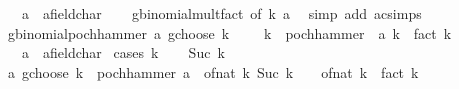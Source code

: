 \begin{isabellebody}
\ \ \ a\ {\isacharcolon}{\kern0pt}{\isacharcolon}{\kern0pt}\ {\isachardoublequoteopen}{\isacharprime}{\kern0pt}a{\isacharcolon}{\kern0pt}{\isacharcolon}{\kern0pt}field{\isacharunderscore}{\kern0pt}char{\isacharunderscore}{\kern0pt}{}{\isachardoublequoteclose}\isanewline
%
\isadelimproof
\ \ %
\endisadelimproof
%
\isatagproof
{}\isamarkupfalse%
\ gbinomial{\isacharunderscore}{\kern0pt}mult{\isacharunderscore}{\kern0pt}fact\ {\isacharbrackleft}{\kern0pt}of\ k\ a{\isacharbrackright}{\kern0pt}\ \isamarkupfalse%
\ {\isacharparenleft}{\kern0pt}simp\ add{\isacharcolon}{\kern0pt}\ ac{\isacharunderscore}{\kern0pt}simps{\isacharparenright}{\kern0pt}%
\endisatagproof
{\isafoldproof}%
%
\isadelimproof
\isanewline
%
\endisadelimproof
\isanewline
{}\isamarkupfalse%
\ gbinomial{\isacharunderscore}{\kern0pt}pochhammer{\isacharcolon}{\kern0pt}\ {\isachardoublequoteopen}a\ gchoose\ k\ {\isacharequal}{\kern0pt}\ {\isacharparenleft}{\kern0pt}{\isacharminus}{\kern0pt}\ {}{\isacharparenright}{\kern0pt}\ {\isacharcircum}{\kern0pt}\ k\ {\isacharasterisk}{\kern0pt}\ pochhammer\ {\isacharparenleft}{\kern0pt}{\isacharminus}{\kern0pt}\ a{\isacharparenright}{\kern0pt}\ k\ {\isacharslash}{\kern0pt}\ fact\ k{\isachardoublequoteclose}\isanewline
\ \ \ a\ {\isacharcolon}{\kern0pt}{\isacharcolon}{\kern0pt}\ {\isachardoublequoteopen}{\isacharprime}{\kern0pt}a{\isacharcolon}{\kern0pt}{\isacharcolon}{\kern0pt}field{\isacharunderscore}{\kern0pt}char{\isacharunderscore}{\kern0pt}{}{\isachardoublequoteclose}\isanewline
%
\isadelimproof
%
\endisadelimproof
%
\isatagproof
{}\isamarkupfalse%
\ {\isacharparenleft}{\kern0pt}cases\ k{\isacharparenright}{\kern0pt}\isanewline
\ \ \isamarkupfalse%
\ {\isacharparenleft}{\kern0pt}Suc\ k{\isacharprime}{\kern0pt}{\isacharparenright}{\kern0pt}\isanewline
\ \ \isamarkupfalse%
\ \isamarkupfalse%
\ {\isachardoublequoteopen}a\ gchoose\ k\ {\isacharequal}{\kern0pt}\ pochhammer\ {\isacharparenleft}{\kern0pt}a\ {\isacharminus}{\kern0pt}\ of{\isacharunderscore}{\kern0pt}nat\ k{\isacharprime}{\kern0pt}{\isacharparenright}{\kern0pt}\ {\isacharparenleft}{\kern0pt}Suc\ k{\isacharprime}{\kern0pt}{\isacharparenright}{\kern0pt}\ {\isacharslash}{\kern0pt}\ {\isacharparenleft}{\kern0pt}{\isacharparenleft}{\kern0pt}{}\ {\isacharplus}{\kern0pt}\ of{\isacharunderscore}{\kern0pt}nat\ k{\isacharprime}{\kern0pt}{\isacharparenright}{\kern0pt}\ {\isacharasterisk}{\kern0pt}\ fact\ k{\isacharprime}{\kern0pt}{\isacharparenright}{\kern0pt}{\isachardoublequoteclose}\isanewline

\end{isabellebody}
